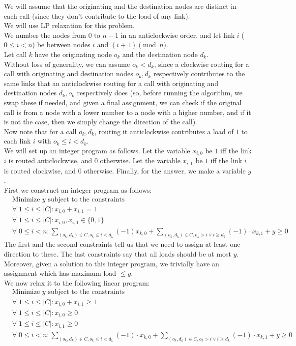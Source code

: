 \documentclass[a4paper]{article}
\newcommand{\nl}{\vspace{0.2cm}\\}
\begin{document}
We will assume that the originating and the destination nodes are distinct in each call (since they don't contribute to the load of any link).\nl
We will use LP relaxation for this problem.\nl
We number the nodes from $0$ to $n - 1$ in an anticlockwise order, and let link $i$ ($0 \le i < n$) be between nodes $i$ and $(i + 1) \pmod n$.\nl
Let call $k$ have the originating node $o_k$ and the destination node $d_k$.\nl
Without loss of generality, we can assume $o_k < d_k$, since a clockwise routing for a call with originating and
destination nodes $o_k, d_k$ respectively contributes to the same links that an anticlockwise routing for a call with originating and destination nodes $d_k, o_k$ respectively does (so,
before running the algorithm, we swap these if needed, and given a final assignment, we can check if the original call is from a node with a lower number to a node with a higher number, and if it is not the case, then we simply
change the direction of the call).\nl
Now note that for a call $o_k, d_k$, routing it anticlockwise contributes a load of $1$ to each link $i$ with $o_k \le i < d_k$.\nl
We will set up an integer program as follows. Let the variable $x_{i, 0}$ be $1$ iff the link $i$ is routed anticlockwise, and $0$ otherwise. Let the variable $x_{i, 1}$ be $1$ iff the link $i$ is routed
clockwise, and $0$ otherwise. Finally, for the answer, we make a variable $y$.\nl
First we construct an integer program as follows:
\begin{align*}
    &\text{Minimize } y \text{ subject to the constraints}\\
    &\forall \; 1 \le i \le |C|: x_{i, 0} + x_{i, 1} = 1\\
    &\forall \; 1 \le i \le |C|: x_{i, 0}, x_{i, 1} \in \{0, 1\}\\
    &\forall \; 0 \le i < n: \sum_{(o_k, d_k) \in C, o_k \le i < d_k} (-1) x_{k, 0} + \sum_{(o_k, d_k) \in C, o_k > i \lor i \ge d_k} (-1) \cdot x_{k, 1} + y \ge 0
\end{align*}
The first and the second constraints tell us that we need to assign at least one direction to these. The last constraints say that all loads should be at most $y$.\nl
Moreover, given a solution to this integer program, we trivially have an assignment which has maximum load $\le y$.\nl
We now relax it to the following linear program:
\begin{align*}
    &\text{Minimize } y \text{ subject to the constraints}\\
    &\forall \; 1 \le i \le |C|: x_{i, 0} + x_{i, 1} \ge 1\\
    &\forall \; 1 \le i \le |C|: x_{i, 0} \ge 0\\
    &\forall \; 1 \le i \le |C|: x_{i, 1} \ge 0\\
    &\forall \; 0 \le i < n: \sum_{(o_k, d_k) \in C, o_k \le i < d_k} (-1) \cdot x_{k, 0} + \sum_{(o_k, d_k) \in C, o_k > i \lor i \ge d_k} (-1) \cdot x_{k, 1} + y \ge 0
\end{align*}
\end{document}
